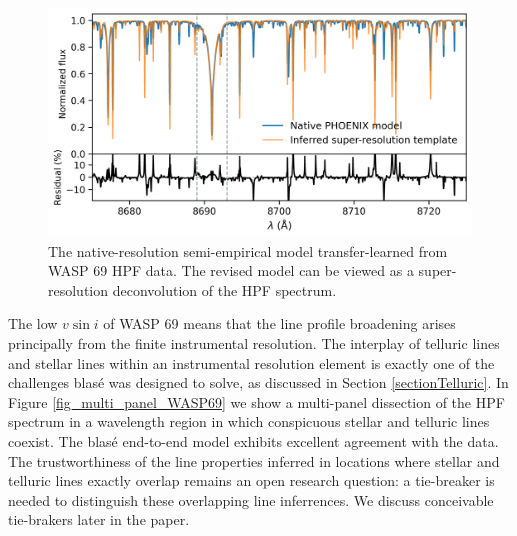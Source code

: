 \documentclass[twocolumn]{aastex631}
\begin{document}
\begin{figure}[hbt!]
    \centering
    \includegraphics[width=0.98\columnwidth]{blase_super_resolution_template.png}
    \caption{The native-resolution semi-empirical model transfer-learned from WASP 69 HPF data. The revised model can be viewed as a super-resolution deconvolution of the HPF spectrum.}
    \label{fig_WASP69_regularized}
\end{figure}


The low $v\sin{i}$ of WASP 69 means that the line profile broadening arises principally from the finite instrumental resolution.  The interplay of telluric lines and stellar lines within an instrumental resolution element is exactly one of the challenges blas\'e was designed to solve, as discussed in Section \ref{sectionTelluric}.  In Figure \ref{fig_multi_panel_WASP69} we show a multi-panel dissection of the HPF spectrum in a wavelength region in which conspicuous stellar and telluric lines coexist.  The blas\'e end-to-end model exhibits excellent agreement with the data.  The trustworthiness of the line properties inferred in locations where stellar and telluric lines exactly overlap remains an open research question: a tie-breaker is needed to distinguish these overlapping line inferrences.  We discuss conceivable tie-brakers later in the paper.
\end{document}
